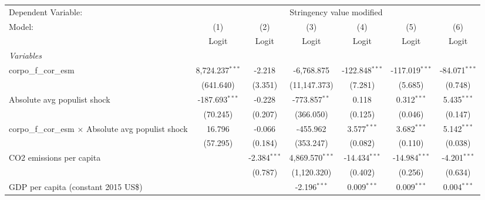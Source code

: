 
\begingroup
\centering
\begin{tabular}{lcccccc}
   \toprule
   Dependent Variable: & \multicolumn{6}{c}{Stringency value modified}\\
   Model:                                                      & (1)               & (2)            & (3)               & (4)              & (5)              & (6)\\  
                                                               &  Logit            & Logit          & Logit             & Logit            & Logit            & Logit\\  
   \midrule
   \emph{Variables}\\
   corpo\_f\_cor\_esm                                          & 8,724.237$^{***}$ & -2.218         & -6,768.875        & -122.848$^{***}$ & -117.019$^{***}$ & -84.071$^{***}$\\   
                                                               & (641.640)         & (3.351)        & (11,147.373)      & (7.281)          & (5.685)          & (0.748)\\   
   Absolute avg populist shock                                 & -187.693$^{***}$  & -0.228         & -773.857$^{**}$   & 0.118            & 0.312$^{***}$    & 5.435$^{***}$\\   
                                                               & (70.245)          & (0.207)        & (366.050)         & (0.125)          & (0.046)          & (0.147)\\   
   corpo\_f\_cor\_esm $\times$ Absolute avg populist shock     & 16.796            & -0.066         & -455.962          & 3.577$^{***}$    & 3.682$^{***}$    & 5.142$^{***}$\\   
                                                               & (57.295)          & (0.184)        & (353.247)         & (0.082)          & (0.110)          & (0.038)\\   
   CO2 emissions per capita                                    &                   & -2.384$^{***}$ & 4,869.570$^{***}$ & -14.434$^{***}$  & -14.984$^{***}$  & -4.201$^{***}$\\   
                                                               &                   & (0.787)        & (1,120.320)       & (0.402)          & (0.256)          & (0.634)\\   
   GDP per capita (constant 2015 US\$)                         &                   &                & -2.196$^{***}$    & 0.009$^{***}$    & 0.009$^{***}$    & 0.004$^{***}$\\   

\end{tabular}
